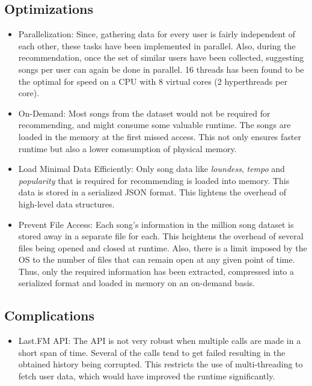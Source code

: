 		\subsection{Optimizations}
\begin{itemize}
	\item Parallelization: Since, gathering data for every user is fairly independent of each other, these tasks have been implemented in parallel. Also, during the recommendation, once the set of similar users have been collected, suggesting songs per user can again be done in parallel. 16 threads has been found to be the optimal for speed on a CPU with 8 virtual cores (2 hyperthreads per core).
	\item On-Demand: Most songs from the dataset would not be required for recommending, and might consume some valuable runtime. The songs are loaded in the memory at the first missed access. This not only ensures faster runtime but also a lower comsumption of physical memory.
	\item Load Minimal Data Efficiently: Only song data like \emph{loundess}, \emph{tempo} and \emph{popularity} that is required for recommending is loaded into memory. This data is stored in a serialized JSON format. This lightens the overhead of high-level data structures.
	\item Prevent File Access: Each song's information in the million song dataset is stored away in a separate file for each. This heightens the overhead of several files being opened and closed at runtime. Also, there is a limit imposed by the OS to the number of files that can remain open at any given point of time. Thus, only the required information has been extracted, compressed into a serialized format and loaded in memory on an on-demand basis.
\end{itemize}
	
		\subsection{Complications}
\begin{itemize}
	\item Last.FM API: The API is not very robust when multiple calls are made in a short span of time. Several of the calls tend to get failed resulting in the obtained history being corrupted. This restricts the use of multi-threading to fetch user data, which would have improved the runtime significantly.
\end{itemize}
	
